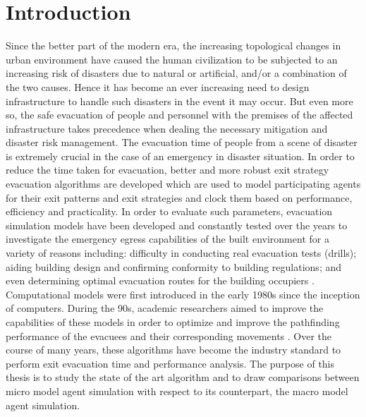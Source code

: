 
\chapter{Introduction\label{ch:intro}}

Since the better part of the modern era, the increasing topological changes in urban environment have caused the human civilization to be subjected to an increasing risk of disasters due to natural or artificial, and/or a combination of the two causes. Hence it has become an ever increasing need to design infrastructure to handle such disasters in the event it may occur. But even more so, the safe evacuation of people and personnel with the premises of the affected infrastructure takes precedence when dealing the necessary mitigation and disaster risk management. The evacuation time of people from a scene of disaster is extremely crucial in the case of an emergency in disaster situation. In order to reduce the time taken for evacuation, better and more robust exit strategy evacuation algorithms are developed which are used to model participating agents for their exit patterns and exit strategies and clock them based on performance, efficiency and practicality. In order to evaluate such parameters, evacuation simulation models have been developed and constantly tested over the years to investigate the emergency egress capabilities of the built environment for a variety of reasons including: difficulty in conducting real evacuation tests (drills); aiding building design and confirming conformity to building regulations; and even determining optimal evacuation routes for the building occupiers \cite{ref1}. Computational models were first introduced in the early 1980s since the inception of computers. During the 90s, academic researchers aimed to improve the capabilities of these models in order to optimize and improve the pathfinding performance of the evacuees and their corresponding movements \cite{ref2}. Over the course of many years, these algorithms have become the industry standard to perform exit evacuation time and performance analysis. The purpose of this thesis is to study the state of the art algorithm and to draw comparisons between micro model agent simulation with respect to its counterpart, the macro model agent simulation.


